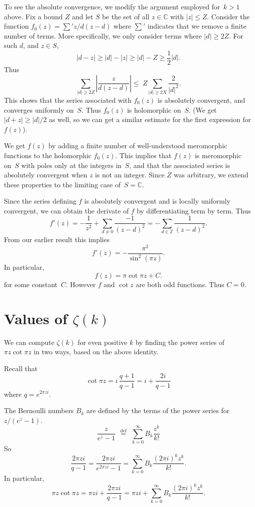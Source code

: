 \documentclass {amsart}
\theoremstyle{plain}
\theoremstyle{definition}
\theoremstyle{remark}
\newcommand{\defeq}{\stackrel{\mathrm{def}}{\, = \,}}
\newcommand{\bZ}{{\mathbb{Z}}}
\newcommand{\bC}{{\mathbb{C}}}
\begin{document}
To see the absolute convergence, we modify the argument employed for~$k > 1$ above.
Fix a bound $Z$ and let $S$ be the set of all $z \in\bC$ with $|z| \le Z$.
Consider
the function $f_0 (z) = \sum'  {z}/{d(z - d)}$ where $\sum'$ indicates that
we remove a finite number of terms. More specifically, we only consider
terms where $|d| \ge 2 Z$. For such $d$, and $z \in S$,
$$
|d - z| \ge |d| - |z| \ge |d| - Z \ge \frac{1}{2} |d|.
$$
Thus
$$
\sum_{|d| \ge 2 Z} \left| \frac{z}{d (z-d)} \right| \le \; Z \sum_{|d| \ge 2 X} \frac{2}{|d|^2}.
$$
This shows that the series associated with $f_0(z)$ is absolutely convergent, and converges
uniformly on~$S$. Thus $f_0(z)$ is holomorphic on~$S$.
(We get $|d  + z| \ge |d|/2$ as well, so we can get a similar estimate for the first expression
for $f(z)$).


We get $f(z)$ by adding a finite number of well-understood meromorphic functions
to the holomorphic $f_0(z)$.
This implies that $f(z)$ is meromorphic on~$S$ with poles only at the integers in~$S$,
and that the associated series is absolutely convergent when $z$ is not an integer.
Since $Z$ was arbitrary, we extend these properties to the limiting case of~$S = \bC$.

Since the series defining $f$ is absolutely convergent and is locally uniformly convergent,
we can obtain the derivate of $f$ by differentiating term by term.
Thus
$$
f'(z) =  - \frac{1}{z^2}  + \sum_{d \ne 0}  \frac{-1}{(z - d)^2}  = -  \sum_{d \in \bZ}  \frac{1}{(z - d)^2} .
$$
From our earlier result this implies
$$
f'(z) =  -\frac {\pi^2} {\sin^{2} (\pi z)}.
$$
In particular,
$$
f(z) = \pi \cot \pi z + C.
$$
for some constant~$C$. However $f$ and $\cot z$ are both odd functions. Thus
$C = 0$.


\section {Values of  $\zeta (k)$}

We can compute $\zeta (k)$ for even positive $k$ by finding the power series
of $\pi z \cot \pi z$ in two ways, based on the above identity.

Recall that 
$$
\cot \pi z = i \, \frac{q + 1}{q - 1} =  i  + \frac{2i}{q-1}
$$
where $q = e^{2 \pi z i}$.  

The Bernoulli numbers $B_k$ are defined by the terms of the power series
for $z / (e^z - 1)$.
$$
\frac{z}{e^z - 1} \;\defeq\; \sum_{k = 0}^\infty B_k \frac{z^k}{k!}
$$
So
$$
\frac{2 \pi zi }{q - 1} =  \frac{2 \pi zi }{e^{2 \pi z i}  - 1}  = 
\sum_{k = 0}^\infty B_k \frac{(2 \pi i)^k z^k}{k!}.
$$
In particular,
$$
\pi z \cot \pi z = \pi z i + \frac{2\pi z i}{q-1} = \pi z i  + \sum_{k = 0}^\infty B_k \frac{(2 \pi i)^k z^k}{k!}.
$$
\end{document}
